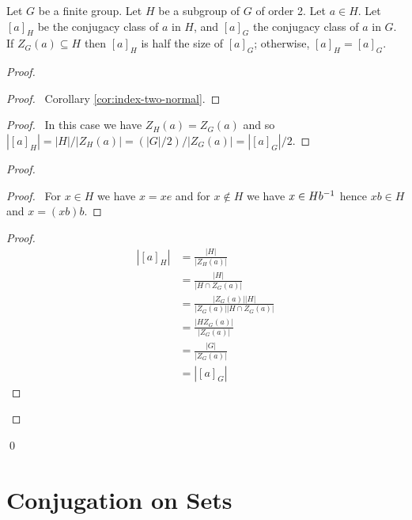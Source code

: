 \begin{prop}
Let $G$ be a finite group. Let $H$ be a subgroup of $G$ of order 2. Let $a \in H$. Let $[a]_H$ be the conjugacy class of $a$ in $H$, and $[a]_G$ the conjugacy class of $a$ in $G$. If $Z_G(a) \subseteq H$ then $[a]_H$ is half the size of $[a]_G$; otherwise, $[a]_H = [a]_G$.
\end{prop}

\begin{proof}
\pf
{}
\begin{proof}
	\pf\ Corollary \ref{cor:index-two-normal}.
\end{proof}
\begin{proof}
	\pf\ In this case we have $Z_H(a) = Z_G(a)$ and so $|[a]_H| = |H| / |Z_H(a)| = (|G|/2)/|Z_G(a)| = |[a]_G|/2$.
\end{proof}
\begin{proof}
	\pf
	\begin{proof}
		\pf\ For $x \in H$ we have $x = xe$ and for $x \notin H$ we have $x \in H{b}^{-1}$ hence $xb \in H$ and $x = (xb)b$.
	\end{proof}
	\begin{proof}
	\pf
	\begin{align*}
		|[a]_H| & = \frac{|H|}{|Z_H(a)|} \\
		& = \frac{|H|}{|H \cap Z_G(a)|} \\
		& = \frac{|Z_G(a)||H|}{|Z_G(a)||H \cap Z_G(a)|} \\
		& = \frac{|HZ_G(a)|}{|Z_G(a)|} \\
		& = \frac{|G|}{|Z_G(a)|} \\
		& = |[a]_G|
	\end{align*}
	\end{proof}
\end{proof}
\qed
\end{proof}

\section{Conjugation on Sets}

